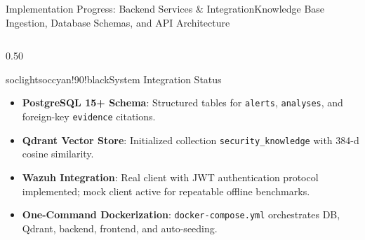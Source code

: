 \documentclass[aspectratio=169, 10pt]{beamer}
\begin{document}
\begin{frame}{Implementation Progress: Backend Services \& Integration}{Knowledge Base Ingestion, Database Schemas, and API Architecture}
\begin{columns}[T]
    \begin{column}{0.50\textwidth}
      \begin{cardbox}{soclight}{soccyan!90!black}{System Integration Status}
        \begin{itemize}\setlength{\itemsep}{1.5pt}
          \item \textbf{PostgreSQL 15+ Schema}: Structured tables for \texttt{alerts}, \texttt{analyses}, and foreign-key \texttt{evidence} citations.
          \item \textbf{Qdrant Vector Store}: Initialized collection \texttt{security\_knowledge} with 384-d cosine similarity.
          \item \textbf{Wazuh Integration}: Real client with JWT authentication protocol implemented; mock client active for repeatable offline benchmarks.
          \item \textbf{One-Command Dockerization}: \texttt{docker-compose.yml} orchestrates DB, Qdrant, backend, frontend, and auto-seeding.
        \end{itemize}
      \end{cardbox}
    \end{column}
  \end{columns}
\end{frame}
\end{document}
